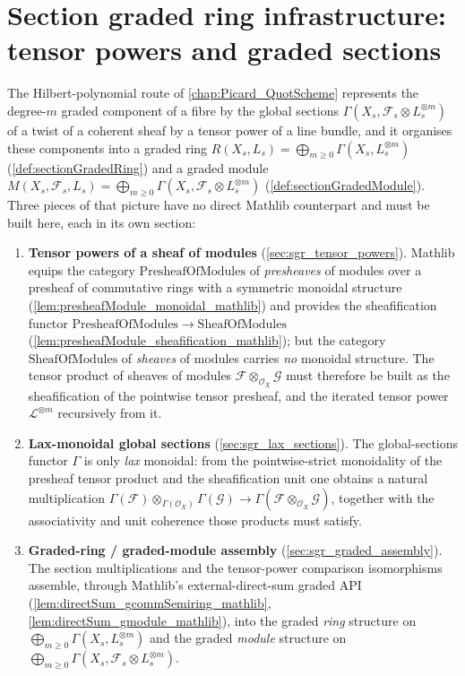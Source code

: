 \chapter{Section graded ring infrastructure: tensor powers and graded sections}
\label{chap:Picard_SectionGradedRing}

\providecommand{\PshMod}{\mathrm{PresheafOfModules}}
\providecommand{\ShMod}{\mathrm{SheafOfModules}}
\providecommand{\Modules}{\mathrm{Modules}}

The Hilbert-polynomial route of \cref{chap:Picard_QuotScheme} represents the
degree-\(m\) graded component of a fibre by the global sections
\(\Gamma(X_s, \mathcal{F}_s \otimes L_s^{\otimes m})\) of a twist of a coherent
sheaf by a tensor power of a line bundle, and it organises these components into
a graded ring \(R(X_s, L_s) = \bigoplus_{m \ge 0} \Gamma(X_s, L_s^{\otimes m})\)
(\cref{def:sectionGradedRing}) and a graded module
\(M(X_s, \mathcal{F}_s, L_s) = \bigoplus_{m \ge 0}
\Gamma(X_s, \mathcal{F}_s \otimes L_s^{\otimes m})\)
(\cref{def:sectionGradedModule}). Three pieces of that picture have no direct
Mathlib counterpart and must be built here, each in its own section:

\begin{enumerate}
  \item \textbf{Tensor powers of a sheaf of modules}
    (\cref{sec:sgr_tensor_powers}). Mathlib equips the category
    \(\PshMod\) of \emph{presheaves} of modules over a presheaf of commutative
    rings with a symmetric monoidal structure
    (\cref{lem:presheafModule_monoidal_mathlib}) and provides the
    sheafification functor \(\PshMod \to \ShMod\)
    (\cref{lem:presheafModule_sheafification_mathlib}); but the category
    \(\ShMod\) of \emph{sheaves} of modules carries \emph{no} monoidal
    structure. The tensor product of sheaves of modules
    \(\mathcal{F} \otimes_{\mathcal{O}_X} \mathcal{G}\) must therefore be built
    as the sheafification of the pointwise tensor presheaf, and the iterated
    tensor power \(\mathcal{L}^{\otimes m}\) recursively from it.
  \item \textbf{Lax-monoidal global sections} (\cref{sec:sgr_lax_sections}).
    The global-sections functor \(\Gamma\) is only \emph{lax} monoidal: from the
    pointwise-strict monoidality of the presheaf tensor product and the
    sheafification unit one obtains a natural multiplication
    \(\Gamma(\mathcal{F}) \otimes_{\Gamma(\mathcal{O}_X)} \Gamma(\mathcal{G})
    \to \Gamma(\mathcal{F} \otimes_{\mathcal{O}_X} \mathcal{G})\), together with
    the associativity and unit coherence those products must satisfy.
  \item \textbf{Graded-ring / graded-module assembly}
    (\cref{sec:sgr_graded_assembly}). The section multiplications and the
    tensor-power comparison isomorphisms assemble, through Mathlib's
    external-direct-sum graded API (\cref{lem:directSum_gcommSemiring_mathlib},
    \cref{lem:directSum_gmodule_mathlib}), into the graded \emph{ring} structure
    on \(\bigoplus_{m \ge 0} \Gamma(X_s, L_s^{\otimes m})\) and the graded
    \emph{module} structure on
    \(\bigoplus_{m \ge 0} \Gamma(X_s, \mathcal{F}_s \otimes L_s^{\otimes m})\).
\end{enumerate}

